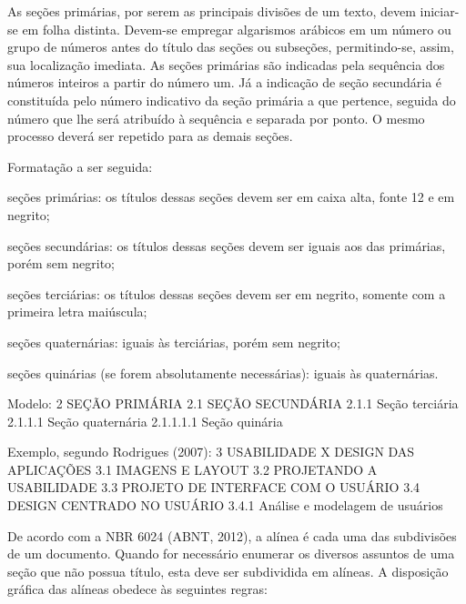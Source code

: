 \documentclass[a4paper,12pt]{article}  %
\begin{document}
\begin{ElementosTextuais}
\begin{Desenvolvimento}
As seções primárias, por serem as principais divisões de um texto, devem iniciar-se em folha distinta. Devem-se empregar algarismos arábicos em um número ou grupo de números antes do título das seções ou subseções, permitindo-se, assim, sua localização imediata. As seções primárias são indicadas pela sequência dos números inteiros a partir do número um. Já a indicação de seção secundária é constituída pelo número indicativo da seção primária a que pertence, seguida do número que lhe será atribuído à sequência e separada por ponto. O mesmo processo deverá ser repetido para as demais seções.

Formatação a ser seguida:

\begin{alinea}
  \item seções primárias: os títulos dessas seções devem ser em caixa alta, fonte 12 e em negrito;
  \item seções secundárias: os títulos dessas seções devem ser iguais aos das primárias, porém sem negrito;
  \item seções terciárias: os títulos dessas seções devem ser em negrito, somente com a primeira letra maiúscula;
  \item seções quaternárias: iguais às terciárias, porém sem negrito;
  \item seções quinárias (se forem absolutamente necessárias): iguais às quaternárias.
\end{alinea}

Modelo:
2 SEÇÃO PRIMÁRIA
2.1 SEÇÃO SECUNDÁRIA
2.1.1 Seção terciária
2.1.1.1 Seção quaternária
2.1.1.1.1 Seção quinária

Exemplo, segundo Rodrigues (2007):
3 USABILIDADE X DESIGN DAS APLICAÇÕES
3.1 IMAGENS E LAYOUT
3.2 PROJETANDO A USABILIDADE
3.3 PROJETO DE INTERFACE COM O USUÁRIO
3.4 DESIGN CENTRADO NO USUÁRIO
3.4.1 Análise e modelagem de usuários

De acordo com a NBR 6024 (ABNT, 2012), a alínea é cada uma das subdivisões de um documento. Quando for necessário enumerar os diversos assuntos de uma seção que não possua título, esta deve ser subdividida em alíneas. A disposição gráfica das alíneas obedece às seguintes regras:


\end{Desenvolvimento}
\end{ElementosTextuais}
\end{document}
